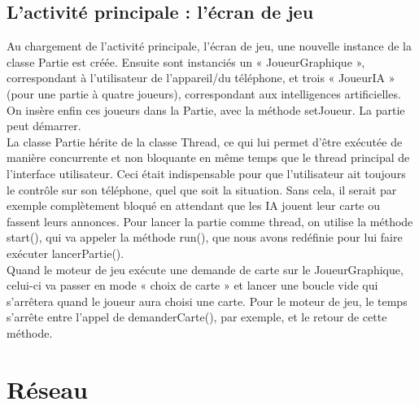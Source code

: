 \documentclass[a4paper]{report}
\begin{document}
		\subsection{L’activité principale : l’écran de jeu}
			Au chargement de l’activité principale, l’écran de jeu, une nouvelle instance de la classe Partie est créée. Ensuite sont instanciés un « 				JoueurGraphique », correspondant à l’utilisateur de l’appareil/du téléphone, et trois « JoueurIA » (pour une partie à quatre joueurs), correspondant aux intelligences 				artificielles. On insère enfin ces joueurs dans la Partie, avec la méthode setJoueur. La partie peut démarrer.\\
			La classe Partie hérite de la classe Thread, ce qui lui permet d’être exécutée de manière concurrente et non bloquante en même temps que le thread principal de 			l’interface utilisateur. Ceci était indispensable pour que l’utilisateur ait toujours le contrôle sur son téléphone, quel que soit la situation. Sans cela, il serait par exemple 				complètement bloqué en attendant que les IA jouent leur carte ou fassent leurs annonces. Pour lancer la partie comme thread, on utilise la méthode start(), qui va appeler la 				méthode run(), que nous avons redéfinie pour lui faire exécuter lancerPartie().\\
			Quand le moteur de jeu exécute une demande de carte sur le JoueurGraphique, celui-ci va passer en mode « choix de carte » et lancer une boucle vide qui s’arrêtera quand le 				joueur aura choisi une carte. Pour le moteur de jeu, le temps s’arrête entre l’appel de demanderCarte(), par exemple, et le retour de cette méthode.\\

	\section{Réseau}
\end{document}
